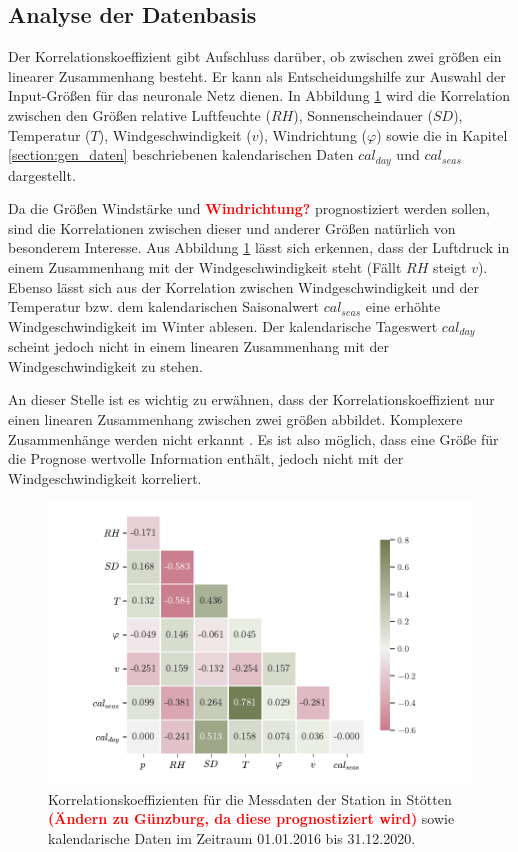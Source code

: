 \documentclass[
12pt, %
toc=listofnumbered, %
toc=chapterentrydotfill, %
numbers=noenddot, %
captions=tableheading, %
bibliography=numbered
]{scrreprt}
\let\Oldsubsection\subsection
\renewcommand{\subsection}{\FloatBarrier\Oldsubsection}
\newcommand{\highlight}[1]{\textbf{\textcolor{red}{#1}}}
\begin{document}
\subsection{Analyse der Datenbasis}
Der Korrelationskoeffizient gibt Aufschluss darüber, ob zwischen zwei größen ein linearer Zusammenhang besteht. Er kann als Entscheidungshilfe zur Auswahl der Input-Größen für das neuronale Netz dienen. In Abbildung \ref{fig:corr} wird die Korrelation zwischen den Größen relative Luftfeuchte ($RH$), Sonnenscheindauer ($SD$), Temperatur ($T$), Windgeschwindigkeit ($v$), Windrichtung ($\varphi$) sowie die in Kapitel \ref{section:gen_daten} beschriebenen kalendarischen Daten $cal_{day}$ und $cal_{seas}$ dargestellt. 



Da die Größen Windstärke und \highlight{Windrichtung?} prognostiziert werden sollen, sind die Korrelationen zwischen dieser und anderer Größen natürlich von besonderem Interesse. Aus Abbildung \ref{fig:corr} lässt sich erkennen, dass der Luftdruck in einem Zusammenhang mit der Windgeschwindigkeit steht (Fällt $RH$ steigt $v$). Ebenso lässt sich aus der Korrelation zwischen Windgeschwindigkeit und der Temperatur bzw. dem kalendarischen Saisonalwert $cal_{seas}$ eine erhöhte Windgeschwindigkeit im Winter ablesen. Der kalendarische Tageswert $cal_{day}$ scheint jedoch nicht in einem linearen Zusammenhang mit der Windgeschwindigkeit zu stehen.

\bigskip
An dieser Stelle ist es wichtig zu erwähnen, dass der Korrelationskoeffizient nur einen linearen Zusammenhang zwischen zwei größen abbildet. Komplexere Zusammenhänge werden nicht erkannt \cite{2020_Ranjan_EstimatingNonlinearCorrelation}. Es ist also möglich, dass eine Größe für die Prognose wertvolle Information enthält, jedoch nicht mit der Windgeschwindigkeit korreliert.

\begin{figure}[tph]
	\begin{center}
		\includegraphics[]{./images/corr.pdf}
		\caption{Korrelationskoeffizienten für die Messdaten der Station in Stötten \highlight{(Ändern zu Günzburg, da diese prognostiziert wird)} sowie kalendarische Daten im Zeitraum 01.01.2016 bis 31.12.2020.}
		\label{fig:corr}
	\end{center}
\end{figure}
\end{document}
